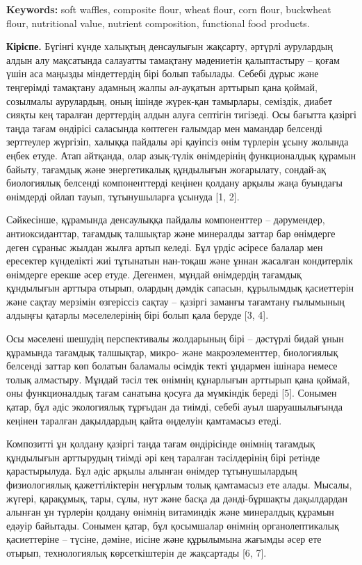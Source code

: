 {\bfseries Keywords:} soft waffles, composite flour, wheat flour, corn
flour, buckwheat flour, nutritional value, nutrient composition,
functional food products.

\begin{multicols}{2}
{\bfseries Кіріспе.} Бүгінгі күнде халықтың денсаулығын жақсарту, әртүрлі
аурулардың алдын алу мақсатында салауатты тамақтану мәдениетін
қалыптастыру -- қоғам үшін аса маңызды міндеттердің бірі болып табылады.
Себебі дұрыс және теңгерімді тамақтану адамның жалпы әл-ауқатын арттырып
қана қоймай, созылмалы аурулардың, оның ішінде жүрек-қан тамырлары,
семіздік, диабет сияқты кең таралған дерттердің алдын алуға септігін
тигізеді. Осы бағытта қазіргі таңда тағам өндірісі саласында көптеген
ғалымдар мен мамандар белсенді зерттеулер жүргізіп, халыққа пайдалы әрі
қауіпсіз өнім түрлерін ұсыну жолында еңбек етуде. Атап айтқанда, олар
азық-түлік өнімдерінің функционалдық құрамын байыту, тағамдық және
энергетикалық құндылығын жоғарылату, сондай-ақ биологиялық белсенді
компоненттерді кеңінен қолдану арқылы жаңа буындағы өнімдерді ойлап
тауып, тұтынушыларға ұсынуда {[}1, 2{]}.

Сәйкесінше, құрамында денсаулыққа пайдалы компоненттер -- дәрумендер,
антиоксиданттар, тағамдық талшықтар және минералды заттар бар өнімдерге
деген сұраныс жылдан жылға артып келеді. Бұл үрдіс әсіресе балалар мен
ересектер күнделікті жиі тұтынатын нан-тоқаш және ұннан жасалған
кондитерлік өнімдерге ерекше әсер етуде. Дегенмен, мұндай өнімдердің
тағамдық құндылығын арттыра отырып, олардың дәмдік сапасын, құрылымдық
қасиеттерін және сақтау мерзімін өзгеріссіз сақтау -- қазіргі заманғы
тағамтану ғылымының алдыңғы қатарлы мәселелерінің бірі болып қала беруде
{[}3, 4{]}.

Осы мәселені шешудің перспективалы жолдарының бірі -- дәстүрлі бидай
ұнын құрамында тағамдық талшықтар, микро- және макроэлементтер,
биологиялық белсенді заттар көп болатын баламалы өсімдік текті ұндармен
ішінара немесе толық алмастыру. Мұндай тәсіл тек өнімнің құнарлығын
арттырып қана қоймай, оны функционалдық тағам санатына қосуға да
мүмкіндік береді {[}5{]}. Сонымен қатар, бұл әдіс экологиялық тұрғыдан
да тиімді, себебі ауыл шаруашылығында кеңінен таралған дақылдардың қайта
өңделуін қамтамасыз етеді.

Композитті ұн қолдану қазіргі таңда тағам өндірісінде өнімнің тағамдық
құндылығын арттырудың тиімді әрі кең таралған тәсілдерінің бірі ретінде
қарастырылуда. Бұл әдіс арқылы алынған өнімдер тұтынушылардың
физиологиялық қажеттіліктерін неғұрлым толық қамтамасыз ете алады.
Мысалы, жүгері, қарақұмық, тары, сұлы, нут және басқа да дәнді-бұршақты
дақылдардан алынған ұн түрлерін қолдану өнімнің витаминдік және
минералдық құрамын едәуір байытады. Сонымен қатар, бұл қосымшалар
өнімнің органолептикалық қасиеттеріне -- түсіне, дәміне, иісіне және
құрылымына жағымды әсер ете отырып, технологиялық көрсеткіштерін де
жақсартады {[}6, 7{]}.


\end{multicols}
